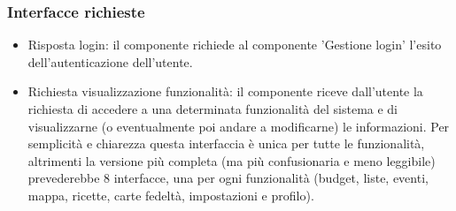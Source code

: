 \documentclass[a4paper,12pt]{article}
\begin{document}
\subsubsection*{Interfacce richieste}
\begin{itemize} \setlength\itemsep{0.01em}
\item {\sffamily Risposta login}: il componente richiede al componente 'Gestione login' l'esito dell'autenticazione dell'utente.
\item {\sffamily Richiesta visualizzazione funzionalità}: il componente riceve dall'utente la richiesta di accedere a una determinata funzionalità del sistema e di visualizzarne (o eventualmente poi andare a modificarne) le informazioni. Per semplicità e chiarezza questa interfaccia è unica per tutte le funzionalità, altrimenti la versione più completa (ma più confusionaria e meno leggibile) prevederebbe 8 interfacce, una per ogni funzionalità (budget, liste, eventi, mappa, ricette, carte fedeltà, impostazioni e profilo).

\end{itemize}
\end{document}
